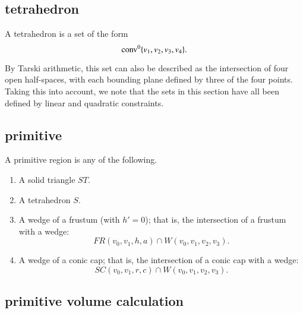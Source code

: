 \subsection{tetrahedron}

\begin{definition}[tetrahedron] A tetrahedron is a set of the form
$${\operatorname{conv}}^0\{v_1,v_2,v_3,v_4\}.$$
\end{definition}

By Tarski arithmetic, this set can also be described
as the intersection of four open half-spaces, with each bounding
plane defined by three of the four points.
Taking this into account, we note that
the sets in this section have all been defined by linear and quadratic
constraints.

\subsection{primitive}

\begin{definition}[primitive] A primitive region is any of the following.

\begin{enumerate}%
 \item A solid triangle $ST$.
 \item A tetrahedron $S$.
 \item A wedge of a frustum (with $h'=0$); 
that is, the intersection of a frustum with
 a wedge:
    $$
     FR(v_0,v_1,h,a) \cap W(v_0,v_1,v_2,v_3).
    $$
\item A wedge of a conic cap; that is, the intersection of a conic cap
with
    a wedge:
    $$
    SC(v_0,v_1,r,c) \cap W(v_0,v_1,v_2,v_3).
    $$
\end{enumerate}

\end{definition}

\subsection{primitive volume calculation}\label{sec:primitive}

